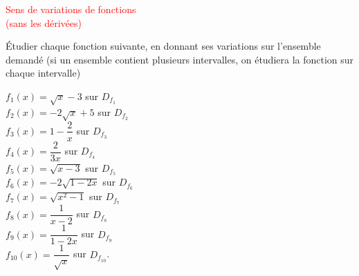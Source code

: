 \usepackage{amsmath,bm}
\usepackage[tikz]{bclogo}





\newcommand{\titre}[1]{\begin{center}{\Large\textcolor{red}{#1}}\end{center}}

\newcommand{\paragraphe}[1]{\large\textcolor{red}{#1}}

\newcommand{\NBVert}[1]{\large\textcolor{DarkGreen}{#1}}

\newcommand{\Attention}[3]{
\begin{bclogo}[%
barre = none,
couleurBord=white,%
logo=\bcattention,%
margeG = -1,%
margeD = 1,%
marge = 15%
]{\textcolor{#1}{$\quad$ #2}}
#3
\end {bclogo}
}

\titre{Sens de variations de fonctions\\
\bigskip
 (sans les dérivées)}
 

Étudier chaque fonction suivante, en donnant ses variations sur l'ensemble demandé (si un ensemble contient plusieurs intervalles, on étudiera la fonction sur chaque intervalle)


$f_1(x) = \sqrt{x} -3$ sur $D_{f_1}$ \\

 $f_2(x) = -2 \sqrt{x} +5 $ sur $D_{f_2}$ \\

$f_3(x) = 1 - \dfrac{2}{x}$ sur $D_{f_3}$ \\

 $f_4(x) = \dfrac{2}{3x} $ sur $D_{f_4}$ \\

$f_5(x) = \sqrt{x -3}$ sur $D_{f_5}$ \\

$f_6(x) = -2 \sqrt{1-2x} $ sur $D_{f_6}$ \\

$f_7(x) = \sqrt{x^2 -1}$ sur $D_{f_7}$ \\

 $f_8(x) =  \dfrac{1}{x -2}  $ sur $D_{f_8}$ \\

$f_9(x) = \dfrac{1}{1-2x}$ sur $D_{f_9}$ \\

 $f_{10}(x) = \dfrac{1}{\sqrt{x}} $ sur $D_{f_{10}}$.







